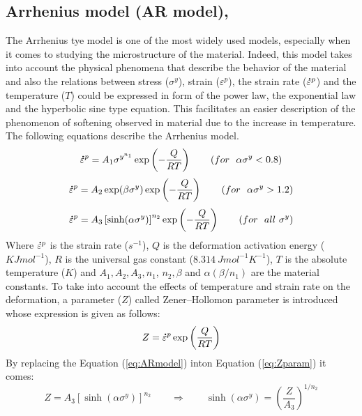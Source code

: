 \documentclass[twoside,english,1p,final,sort&compress]{elsarticle}
\theoremstyle{plain}
\newcommand{\mdot}[1]{\accentset{\mbox{\bfseries .}}{#1}}
\begin{document}
\subsection{Arrhenius model (AR model), \label{sec:ARmodel}}
The Arrhenius tye model is one of the most widely used models, especially when it comes to studying the microstructure of the material. Indeed, this model takes into account the physical phenomena that describe the behavior of the material and also the relations between stress ($\sigma^y$), strain ($\varepsilon^p$), the strain rate ($\mdot{\varepsilon}^p$) and the temperature ($T$) could be expressed in form of the power law, the exponential law and the hyperbolic sine type equation. This facilitates an easier description of the phenomenon of softening observed in material due to the increase in temperature. The following equations describe the Arrhenius model.
\begin{equation}
\label{eq:ARmodel1}
\mdot{\varepsilon}^p = A_1\sigma^{y^{n_1}}\exp\left(-\frac{Q}{RT}\right) \qquad (for ~~\alpha\sigma^y < 0.8)
\end{equation}
\begin{equation}
\label{eq:ARmodel2}
\mdot{\varepsilon}^p = A_2\exp(\beta\sigma^y)\exp\left(-\frac{Q}{RT}\right) \qquad (for ~~\alpha\sigma^y > 1.2)
\end{equation}
\begin{equation}
\label{eq:ARmodel}
\mdot{\varepsilon}^p = A_3\left[\sinh(\alpha\sigma^y)\right]^{n_2}\exp\left(-\frac{Q}{RT}\right) \qquad (for ~~all\ \sigma^y)
\end{equation}
Where $\mdot{\varepsilon}^p$ is the strain rate ($s^{-1}$), $Q$ is the deformation activation energy ($KJmol^{-1}$), $R$ is the universal gas constant ($8.314\ J mol^{-1} K^{-1}$), $T$ is the absolute temperature ($K$) and $A_1, A_2, A_3, n_1$, $n_2, \beta$ and $\alpha(\beta/n_1)$ are the material constants. To take into account the effects of temperature and strain rate on the deformation, a parameter ($Z$) called Zener--Hollomon parameter is introduced whose expression is given as follows:
\begin{equation}
\label{eq:Zparam}
Z = \mdot{\varepsilon}^p\exp\left(\frac{Q}{RT}\right)
\end{equation}
By replacing the Equation (\ref{eq:ARmodel}) inton Equation (\ref{eq:Zparam}) it comes:
\begin{equation}
\label{eq:Zparam1}
Z = A_3\left[\sinh(\alpha\sigma^y)\right]^{n_2} \qquad \Rightarrow \qquad \sinh(\alpha\sigma^y) = \left(\frac{Z}{A_3}\right)^{1/n_2}
\end{equation}
\end{document}
